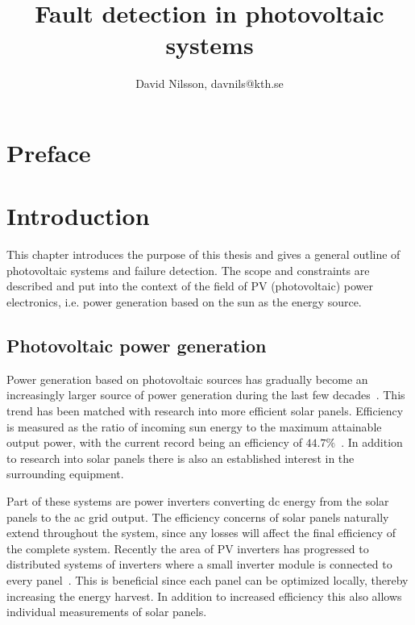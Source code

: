 


\title{Fault detection in photovoltaic systems}
\author{David Nilsson, davnils@kth.se}



\maketitle


\tableofcontents

\chapter*{Preface}
\lipsum[1]

\printglossaries
\cleardoublepage
{}
\listoffigures
\clearpage
{}

\chapter{Introduction}
This chapter introduces the purpose of this thesis and gives a general outline of photovoltaic systems and failure detection.
The scope and constraints are described and put into the context of the field of PV (photovoltaic) power electronics, i.e. power generation based on the sun as the energy source.

\section{Photovoltaic power generation}
Power generation based on photovoltaic sources has gradually become an increasingly larger source of power generation during the last few decades~\cite{Zhao2010thesis}.
This trend has been matched with research into more efficient solar panels.
Efficiency is measured as the ratio of incoming sun energy to the maximum attainable output power, with the current record being an efficiency of $44.7\%$~\cite{Fraunhofer2013}.
In addition to research into solar panels there is also an established interest in the surrounding equipment.

Part of these systems are power inverters converting dc energy from the solar panels to the ac grid output.
The efficiency concerns of solar panels naturally extend throughout the system, since any losses will affect the final efficiency of the complete system.
Recently the area of PV inverters has progressed to distributed systems of inverters where a small inverter module is connected to every panel~\cite{Roman2006}.
This is beneficial since each panel can be optimized locally, thereby increasing the energy harvest.
In addition to increased efficiency this also allows individual measurements of solar panels.

